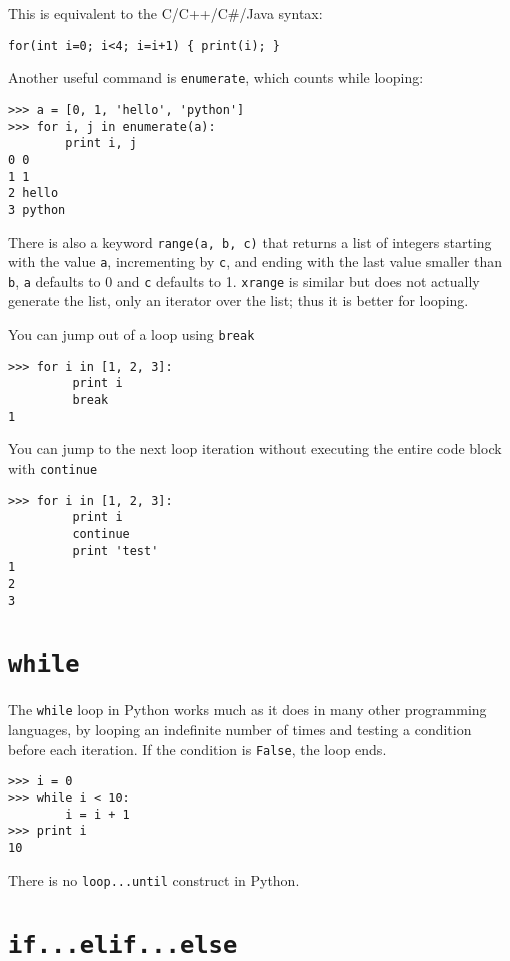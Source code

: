 \documentclass[justified,sixbynine,notoc]{tufte-book}
\def\ft{\small\tt}
\def\inxx#1{\index{#1}}
\begin{document}
\begin{fullwidth}
This is equivalent to the C/C++/C\#/Java syntax:
\begin{lstlisting}
for(int i=0; i<4; i=i+1) { print(i); }
\end{lstlisting}

Another useful command is {\ft enumerate}, which counts while looping:
\begin{lstlisting}
>>> a = [0, 1, 'hello', 'python']
>>> for i, j in enumerate(a):
        print i, j
0 0
1 1
2 hello
3 python
\end{lstlisting}

There is also a keyword {\ft range(a, b, c)} that returns a list of integers starting with the value {\ft a}, incrementing by {\ft c}, and ending with the last value smaller than {\ft b},  {\ft a} defaults to 0 and {\ft c} defaults to 1. {\ft xrange} is similar but does not actually generate the list, only an iterator over the list; thus it is better for looping.

You can jump out of a loop using {\ft break}
\begin{lstlisting}
>>> for i in [1, 2, 3]:
         print i
         break
1
\end{lstlisting}

You can jump to the next loop iteration without executing the entire code block with {\ft continue}
\begin{lstlisting}
>>> for i in [1, 2, 3]:
         print i
         continue
         print 'test'
1
2
3
\end{lstlisting}

\goodbreak\section{{\ft while}}

\inxx{while}
The {\ft while} loop in Python works much as it does in many other programming languages, by looping an indefinite number of times and testing a condition before each iteration. If the condition is {\ft False}, the loop ends.
\begin{lstlisting}
>>> i = 0
>>> while i < 10:
        i = i + 1
>>> print i
10
\end{lstlisting}

There is no {\ft loop...until} construct in Python.

\goodbreak\section{{\ft if...elif...else}}


\end{fullwidth}
\end{document}
